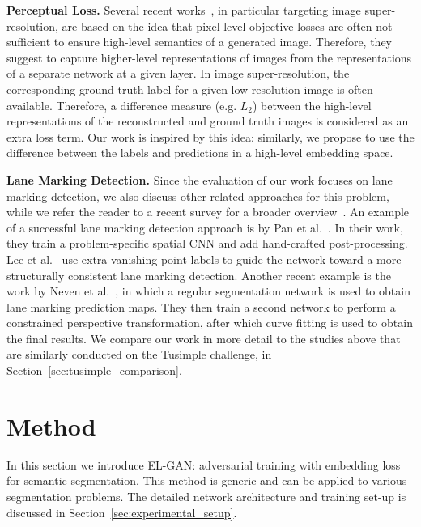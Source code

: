 \documentclass{article} \usepackage{nips13submit_e,times}
\newcommand{\elgan}{\mbox{EL-GAN}}
\begin{document}
\textbf{Perceptual Loss.}
Several recent works~\cite{sajjadi2017enhancenet,dosovitskiy2016generating,johnson2016perceptual}, in particular targeting image super-resolution, are based on the idea that pixel-level objective losses are often not sufficient to ensure high-level semantics of a generated image.
Therefore, they suggest to capture higher-level representations of images from the representations of a separate network at a given layer.
In image super-resolution, the corresponding ground truth label for a given low-resolution image is often available.
Therefore, a difference measure (e.g. $L_2$) between the high-level representations of the reconstructed and ground truth images is considered as an extra loss term.
Our work is inspired by this idea: similarly, we propose to use the difference between the labels and predictions in a high-level embedding space.


\textbf{Lane Marking Detection.}
Since the evaluation of our work focuses on lane marking detection, we also discuss other related approaches for this problem, while we refer the reader to a recent survey for a broader overview~\cite{barhillel2014recent}.
An example of a successful lane marking detection approach is by Pan et al.~\cite{pan2017spatial}.
In their work, they train a problem-specific spatial CNN and add hand-crafted post-processing.
Lee et al.~\cite{lee2017vpgnet} use extra vanishing-point labels to guide the network toward a more structurally consistent lane marking detection.
Another recent example is the work by Neven et al.~\cite{neven2018towards}, in which a regular segmentation network is used to obtain lane marking prediction maps.
They then train a second network to perform a constrained perspective transformation, after which curve fitting is used to obtain the final results.
We compare our work in more detail to the studies above \cite{neven2018towards,pan2017spatial} that are similarly conducted on the Tusimple challenge, in Section~\ref{sec:tusimple_comparison}.




\section{Method}
\label{sec:method}

In this section we introduce \elgan{}: adversarial training with embedding loss for semantic segmentation.
This method is generic and can be applied to various segmentation problems.
The detailed network architecture and training set-up is discussed in Section~\ref{sec:experimental_setup}.
\end{document}
